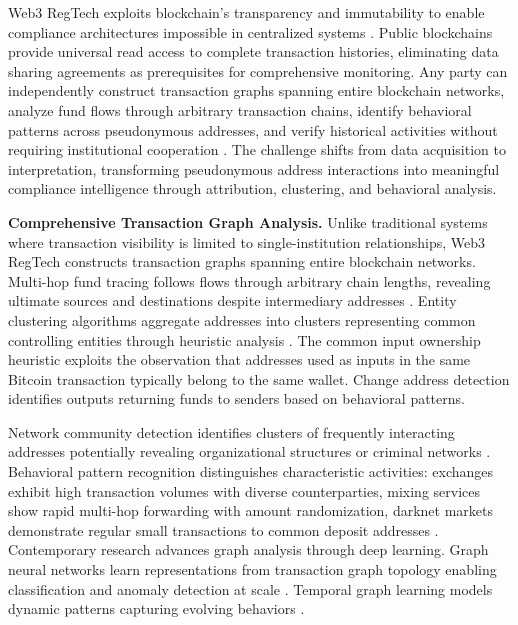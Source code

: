 Web3 RegTech exploits blockchain's transparency and immutability to enable compliance architectures impossible in centralized systems \cite{nakamoto2008bitcoinpeertopeerelectronic,narayanan2016bitcoincryptocurrencytechnologies}. Public blockchains provide universal read access to complete transaction histories, eliminating data sharing agreements as prerequisites for comprehensive monitoring. Any party can independently construct transaction graphs spanning entire blockchain networks, analyze fund flows through arbitrary transaction chains, identify behavioral patterns across pseudonymous addresses, and verify historical activities without requiring institutional cooperation \cite{bonneau2015sokresearchperspectives}. The challenge shifts from data acquisition to interpretation, transforming pseudonymous address interactions into meaningful compliance intelligence through attribution, clustering, and behavioral analysis.

\noindent\textbf{Comprehensive Transaction Graph Analysis.}
Unlike traditional systems where transaction visibility is limited to single-institution relationships, Web3 RegTech constructs transaction graphs spanning entire blockchain networks. Multi-hop fund tracing follows flows through arbitrary chain lengths, revealing ultimate sources and destinations despite intermediary addresses \cite{moser2013inquirymoneylaundering,ron2013quantitativeanalysisfull}. Entity clustering algorithms aggregate addresses into clusters representing common controlling entities through heuristic analysis \cite{meiklejohn2013fistfulbitcoinscharacterizing,reid2013analysisanonymitybitcoin,androulaki2013evaluatinguserprivacy}. The common input ownership heuristic exploits the observation that addresses used as inputs in the same Bitcoin transaction typically belong to the same wallet. Change address detection identifies outputs returning funds to senders based on behavioral patterns.

Network community detection identifies clusters of frequently interacting addresses potentially revealing organizational structures or criminal networks \cite{wu2021detectingmixingservices,drezewski2015applicationsocialnetwork}. Behavioral pattern recognition distinguishes characteristic activities: exchanges exhibit high transaction volumes with diverse counterparties, mixing services show rapid multi-hop forwarding with amount randomization, darknet markets demonstrate regular small transactions to common deposit addresses \cite{moser2018empiricalanalysistraceability}. Contemporary research advances graph analysis through deep learning. Graph neural networks learn representations from transaction graph topology enabling classification and anomaly detection at scale \cite{weber2019antimoneylaunderingbitcoin,azad2025machinelearningblockchain,ancelotti2024reviewblockchainapplication}. Temporal graph learning models dynamic patterns capturing evolving behaviors \cite{arnold2024insightscaveatsmining,luo2025optimizingblockchainanalysis}.

